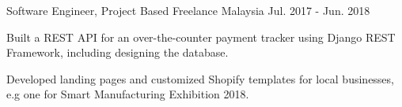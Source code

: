\begin{cventries}
  \cventry
    {Software Engineer, Project Based} %
    {Freelance} %
    {Malaysia} %
    {Jul. 2017 - Jun. 2018} %
    {
      \begin{cvitems} %
        \item {Built a REST API for an over-the-counter payment tracker using Django REST Framework, including designing the database.}
        \item {Developed landing pages and customized Shopify templates for local businesses, e.g one for Smart Manufacturing Exhibition 2018.}
      \end{cvitems}
    }

\end{cventries}

